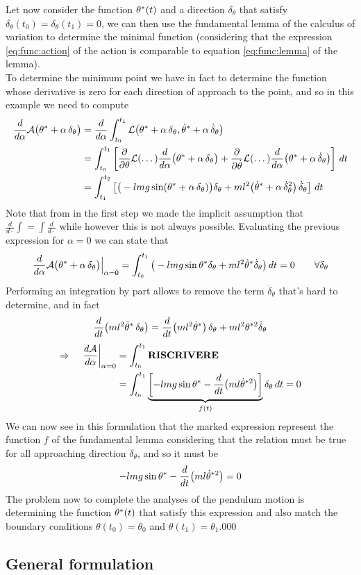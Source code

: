 	Let now consider the function $\theta^*(t)$ and a direction $\delta_\theta$ that satisfy $\delta_\theta(t_0)=\delta_\theta(t_1) = 0$, we can then use the fundamental lemma of the calculus of variation to determine the minimal function (considering that the expression \ref{eq:func:action} of the action is comparable to equation \ref{eq:func:lemma} of the lemma).\\
	To determine the minimum point we have in fact to determine the function whose derivative is zero for each direction of approach to the point, and so in this example we need to compute
	\begin{align*}
		\frac{d}{d\alpha} \mathcal A\big(\theta^* + \alpha\, \delta_\theta\big) & = \frac{d}{d\alpha}\int_{t_0}^{t_1} \mathcal L \big( \theta ^* + \alpha\, \delta_\theta, \dot\theta^* + \alpha\, \dot \delta_\theta \big) \\
		& = \int_{t_0}^{t_1} \left[\frac{\partial }{\partial \theta} \mathcal L( \dots ) \frac{d}{d\alpha}\big(\theta^* + \alpha \,\delta_\theta\big) +\frac{\partial }{\partial \dot\theta} \mathcal L (\dots) \frac{d}{d\alpha}\big(\theta^* + \alpha \,\dot \delta_\theta\big) \right]\, dt \\
		& = \int_{t_1}^{t_2} \left[ \big(-lmg\sin(\theta^* + \alpha\, \delta_\theta)\big)\delta_\theta + ml^2\big(
		\dot\theta^* + \alpha \, \dot\delta_\theta^2 \big)\, \dot\delta_\theta \right] \, dt
	\end{align*}
	Note that from in the first step we made the implicit assumption that $ \frac d{d\cdot} \int = \int\frac{d}{d\cdot}$ while however this is not always possible. Evaluating the previous expression for $\alpha = 0$ we can state that
	\[ 	\frac{d}{d\alpha} \mathcal A\big(\theta^* + \alpha\, \delta_\theta\big) \Big|_{\alpha = 0} = \int_{t_0}^{t_1} \big(-lmg \sin\theta^*\delta_\theta + ml^2\dot\theta^* \dot\delta_\theta \big) \, dt = 0 \qquad \forall \delta_\theta \]
	Performing an integration by part allows to remove the term $\dot\delta_\theta$ that's hard to determine, and in fact
	\[ \frac{d}{dt}\big( ml^2\dot\theta^* \, \delta_\theta\big) = \frac{d}{dt}\big(ml^2\dot\theta^*\big)\,\delta_\theta + ml^2\theta^{*2} \dot\delta_\theta\]
	\begin{align*}
		\Rightarrow \quad \left. \frac{d\mathcal A}{d\alpha}\right|_{\alpha = 0} & = \int_{t_0}^{t_1} \text{\textbf{RISCRIVERE}} \\
		& = \int_{t_0}^{t_1} \underbrace{\left[ -lmg \sin\theta^* - \frac d{dt}\big(ml \dot\theta^{*2}\big) \right]}_{f(t)} \delta_\theta\, dt = 0
	\end{align*}
	We can now see in this formulation that the marked expression represent the function $f$ of the fundamental lemma considering that the relation must be true for all approaching direction $\delta_\theta$, and so it must be
	\[ -lmg \sin\theta^* - \frac d{dt}\big(ml \dot\theta^{*2}\big) = 0 \]
	The problem now to complete the analyses of the pendulum motion is determining the function $\theta^*(t)$ that satisfy this expression and also match the boundary conditions $\theta(t_0) = \theta_0$ and $\theta(t_1)=\theta_1$.000
	
\subsection{General formulation}
	
	
	
	
	
	
	
	
	
	